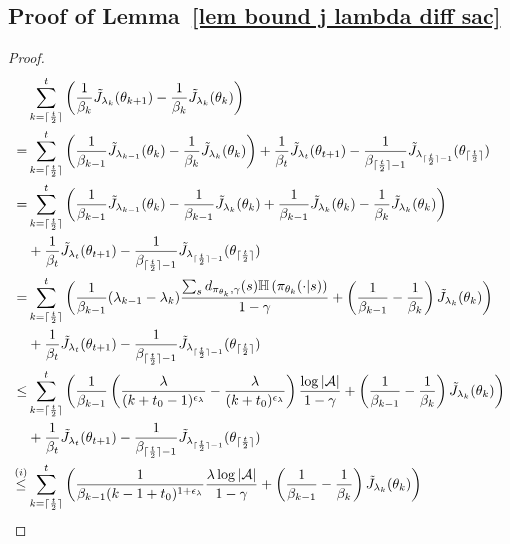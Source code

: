 \documentclass[twoside,11pt]{article}
\DeclarePairedDelimiter{\ceil}{\lceil}{\rceil}
\newcommand{\fA}{\mathcal{A}}
\newcommand{\na}{{|\fA|}}
\newcommand{\ent}[1]{\mathbb{H}\left(#1\right)}
\numberwithin{assucounter}{section}
\begin{document}
\subsection{Proof of Lemma~\ref{lem bound j lambda diff sac}}
\label{sec proof lem bound j lambda diff sac}
\lemboundjlambdadiffsac*
\begin{proof}
  \begin{align}
    &\sum_{k=\ceil{\frac{t}{2}}}^t \left(\frac{1}{\beta_k}\tilde J_{\lambda_k}(\theta_{k+1}) - \frac{1}{\beta_k}\tilde J_{\lambda_k}(\theta_k) \right) \\
    =& \sum_{k=\ceil{\frac{t}{2}}}^t\left(\frac{1}{\beta_{k-1}}\tilde J_{\lambda_{k-1}}(\theta_k) - \frac{1}{\beta_k}\tilde J_{\lambda_k}(\theta_k) \right) + \frac{1}{\beta_t} \tilde J_{\lambda_t}(\theta_{t+1}) - \frac{1}{\beta_{\ceil{\frac{t}{2}}-1}} \tilde J_{\lambda_{\ceil{\frac{t}{2}}-1}}(\theta_{\ceil{\frac{t}{2}}}) \\
    =& \sum_{k=\ceil{\frac{t}{2}}}^t\left(\frac{1}{\beta_{k-1}}\tilde J_{\lambda_{k-1}}(\theta_{k}) - \frac{1}{\beta_{k-1}} \tilde J_{\lambda_k}(\theta_k) + \frac{1}{\beta_{k-1}} \tilde J_{\lambda_k}(\theta_k) - \frac{1}{\beta_k}\tilde J_{\lambda_k}(\theta_k) \right) \\
    &+ \frac{1}{\beta_t} \tilde J_{\lambda_t}(\theta_{t+1}) - \frac{1}{\beta_{\ceil{\frac{t}{2}} - 1}} \tilde J_{\lambda_{\ceil{\frac{t}{2}}- 1}}(\theta_{\ceil{\frac{t}{2}}}) \\
    =& \sum_{k=\ceil{\frac{t}{2}}}^t\left(\frac{1}{\beta_{k-1}}(\lambda_{k-1} - \lambda_{k}) \frac{\sum_s d_{\pi_{\theta_k}, \gamma}(s) \ent{\pi_{\theta_k}(\cdot |s)}}{1 - \gamma}  + \left(\frac{1}{\beta_{k-1}} - \frac{1}{\beta_k}\right) \tilde J_{\lambda_k}(\theta_k) \right) \\
    &+ \frac{1}{\beta_t} \tilde J_{\lambda_t}(\theta_{t+1}) - \frac{1}{\beta_{\ceil{\frac{t}{2}}-1}} \tilde J_{\lambda_{\ceil{\frac{t}{2}} - 1}}(\theta_{\ceil{\frac{t}{2}}}) \\
    \leq& \sum_{k=\ceil{\frac{t}{2}}}^t\left(\frac{1}{\beta_{k-1}}\left(\frac{\lambda}{(k+t_0-1)^{\epsilon_\lambda}} - \frac{\lambda}{(k+t_0)^{\epsilon_\lambda}}\right) \frac{\log \na}{1-\gamma} + \left(\frac{1}{\beta_{k-1}} - \frac{1}{\beta_k}\right) \tilde J_{\lambda_k}(\theta_k) \right) \\
    &+ \frac{1}{\beta_t} \tilde J_{\lambda_t}(\theta_{t+1}) - \frac{1}{\beta_{\ceil{\frac{t}{2}}-1}} \tilde J_{\lambda_{\ceil{\frac{t}{2}} - 1}}(\theta_{\ceil{\frac{t}{2}}}) \\
    \overset{(i)}{\leq} & \sum_{k=\ceil{\frac{t}{2}}}^t \left(\frac{1}{\beta_{k-1}(k-1+t_0)^{1+\epsilon_\lambda}} \frac{\lambda \log \na}{1-\gamma} +  \left(\frac{1}{\beta_{k-1}} - \frac{1}{\beta_k}\right) \tilde J_{\lambda_k}(\theta_k) \right) \\

\end{align}
\end{proof}
\end{document}
